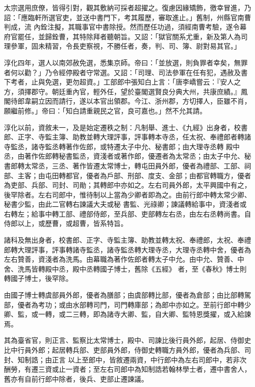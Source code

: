\begin{pinyinscope}
 太宗選用庶僚，皆得引對，觀其敷納可採者超擢之。復慮因緣矯飾，徼幸冒進，乃詔：「應臨軒所選官吏，並送中書門下，考其履歷，審取進止。」舊制，州縣官南曹判成，流
 內銓注擬，其職事官中書除授。然而歷任功過，須經南曹考驗，遂令幕府官罷任，並歸銓曹，其特除拜者聽朝旨。又詔：「獄官關系尤重，新及第人為司理參軍，固未精習，令長吏察視，不勝任者，奏，判、司、簿、尉對易其官。」



 淳化四年，選人以南郊赦免選，悉集京師。帝曰：「並放選，則負罪者幸矣，無罪者何以勸？」乃令經停殿者守常選。又詔：「司理、司法參軍在任有犯，遇赦及書下考者，止與免選，更勿超資。」工部郎中張知白上言：「唐李嶠嘗云：『安人之
 方，須擇郡守。朝廷重內官，輕外任，望於臺閣選賢良分典大州，共康庶績。』鳳閣待郎韋嗣立因而請行，遂以本官出領郡。今江、浙州郡，方切擇人，臣雖不肖，願繼前修。」帝曰：「知白請重親民之官，良可嘉也。」然不允其請。



 淳化以前，資敘未一，及是始定遷秩之制：凡制舉、進士、《九經》出身者，校書郎、正字、寺監主簿、助教並轉大理評事，評事轉本寺丞，任太祝、奉禮郎者轉諸寺監丞，諸寺監丞轉著作佐郎，或特遷太子中允、秘書郎；由大理寺丞轉
 殿中丞，由著作佐郎轉秘書監丞，資淺者或著作郎，優遷者為太常丞；由太子中允、秘書郎轉太常丞，三丞、著作皆遷太常博士，轉屯田員外郎，優者為禮部、工部、祠部、主客；由屯田轉都官，優者為戶部、刑部、度支、金部；由都官轉職方，優者為吏部、兵部、司封、司勛；其轉郎中亦如之。左右司員外郎，太平興國中有之，後罕除者。左右司郎中，惟待制以上當為少卿者即為之。由前行郎中轉太常少卿、秘書少監，由此二官轉右諫議大夫或秘
 書監、光祿卿；諫議轉給事中，資淺者或右轉左；給事中轉工部、禮部侍郎，至兵部、吏部轉左右丞，由左右丞轉尚書。自侍郎以上，或歷曹，或超曹，皆系特旨。



 諸科及無出身者，校書郎、正字、寺監主簿、助教並轉太祝、奉禮郎，太祝、奉禮郎轉大理評事，評事轉諸寺監丞，諸寺監丞轉大理寺丞，大理寺丞轉中舍，優者為左右贊善，資淺者為洗馬。由幕職為著作佐郎者轉太子中允。由中允、贊善、中舍、洗馬皆轉殿中丞，殿中丞轉國子博士，舊除《五經》
 者，至《春秋》博士則轉國子博士，後罕除。



 由國子博士轉虞部員外郎，優者為膳部；由虞部轉比部，優者為倉部；由比部轉駕部，優者為考功；或由水部轉司門，司門轉庫部；為郎中亦如之。至前行郎中轉少卿、監，或一轉，或二三轉，即為諸寺大卿、監，自大卿、監特恩獎擢，或入給諫焉。



 其為臺省官，則正言、監察比太常博士，殿中、司諫比後行員外郎，起居、侍御史比中行員外郎；起居轉兵部、吏部員外郎，侍御史轉職方員外郎，優者為兵部、司封、知制誥；由正言
 以上至郎中，皆敘遷兩資，中行郎中為左右司郎中，若非次酬勞，有遷三資或止一資者；至左右司郎中為知制誥若翰林學士者，遷中書舍人，舊亦有自前行郎中除者，後兵、吏部止遷諫議。




\end{pinyinscope}
